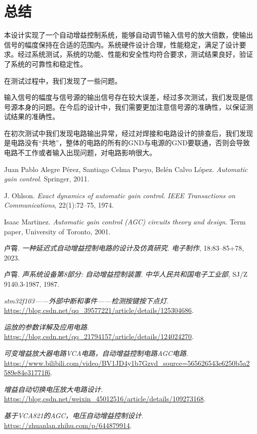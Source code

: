 \documentclass[lang=cn,11pt,a4paper]{elegantpaper}
\begin{document}
\section{总结}
本设计实现了一个自动增益控制系统，能够自动调节输入信号的放大倍数，使输出信号的幅度保持在合适的范围内。系统硬件设计合理，性能稳定，满足了设计要求。经过系统测试，系统的功能、性能和安全性均符合要求，测试结果良好，验证了系统的可靠性和稳定性。

在测试过程中，我们发现了一些问题。

输入信号的幅度与信号源的输出信号存在较大误差，经过多次测试，我们发现是信号源本身的问题。在今后的设计中，我们需要更加注意信号源的准确性，以保证测试结果的准确性。

在初次测试中我们发现电路输出异常，经过对焊接和电路设计的排查后，我们发现是电路没有“共地”，整体的电路的所有的GND与电源的GND要联通，否则会导致电路不工作或者输入出现问题，对电路影响很大。

\begin{thebibliography}{99} %
  Juan Pablo Alegre Pérez, Santiago Celma Pueyo, Belén Calvo López.
  \textit{Automatic gain control}.
  Springer, 2011.

  J. Ohlson.
  \textit{Exact dynamics of automatic gain control}.
  \textit{IEEE Transactions on Communications}, 22(1):72--75, 1974.

  Isaac Martinez.
  \textit{Automatic gain control (AGC) circuits theory and design}.
  Term paper, University of Toronto, 2001.

  卢霄.
  \textit{一种延迟式自动增益控制电路的设计及仿真研究}.
  \textit{电子制作}, 18:83--85+78, 2023.

  卢霄.
  \textit{声系统设备第8部分: 自动增益控制装置}.
  \textit{中华人民共和国电子工业部}, SJ/Z 9140.3-1987, 1987.


  \textit{stm32f103——外部中断和事件——检测按键按下点灯}.
  \url{https://blog.csdn.net/qq_39577221/article/details/125304686}.

  \textit{运放的参数详解及应用电路}.
  \url{https://blog.csdn.net/qq_21794157/article/details/124024270}.

  \textit{可变增益放大器电路VCA电路，自动增益控制电路AGC电路}.
  \url{https://www.bilibili.com/video/BV1JD4y1b7Gzvd_source=565626543e6250b5a2589e84e31771f6}.

  \textit{增益自动切换电压放大电路设计}.
  \url{https://blog.csdn.net/weixin_45012516/article/details/109273168}.

  \textit{基于VCA821的AGC，电压自动增益控制设计}.
  \url{https://zhuanlan.zhihu.com/p/644879914}.
\end{thebibliography}
\end{document}
